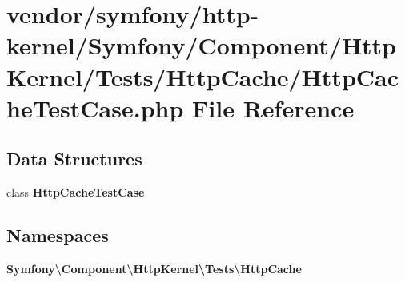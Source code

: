\section{vendor/symfony/http-\/kernel/\+Symfony/\+Component/\+Http\+Kernel/\+Tests/\+Http\+Cache/\+Http\+Cache\+Test\+Case.php File Reference}
\label{_http_cache_test_case_8php}
\subsection*{Data Structures}
\begin{DoxyCompactItemize}
\item 
class {\bf Http\+Cache\+Test\+Case}
\end{DoxyCompactItemize}
\subsection*{Namespaces}
\begin{DoxyCompactItemize}
\item 
 {\bf Symfony\textbackslash{}\+Component\textbackslash{}\+Http\+Kernel\textbackslash{}\+Tests\textbackslash{}\+Http\+Cache}
\end{DoxyCompactItemize}
